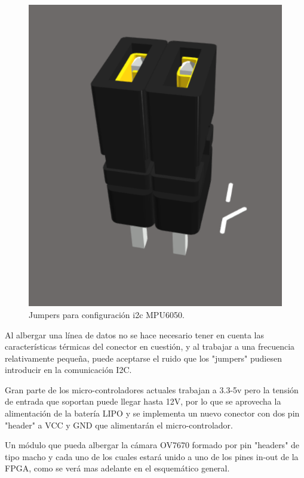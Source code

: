 \begin{itemize}
{		\begin{figure}[H]
			\center
			\includegraphics[scale=0.5]{imagenes/Balancing_robot/jumpers.PNG}
			\caption{Jumpers para configuración i2c MPU6050.}
			\label{fig:jumpers}
		\end{figure}
		
		
		Al albergar una línea de datos no se hace necesario tener en cuenta las características térmicas del conector en cuestión, y al trabajar a una frecuencia relativamente pequeña, puede aceptarse el ruido que los "jumpers" pudiesen introducir en la comunicación I2C.
		
		\item Gran parte de los micro-controladores actuales trabajan a 3.3-5v pero la tensión de entrada que soportan puede llegar hasta 12V, por lo que se aprovecha la alimentación de la batería LIPO y se implementa un nuevo conector con dos pin "header" a VCC y GND que alimentarán el micro-controlador.
		
		\item Un módulo que pueda albergar la cámara OV7670 formado por pin "headers" de tipo macho y cada uno de los cuales estará unido a uno de los pines in-out de la FPGA, como se verá mas adelante en el esquemático general. 
		
}
\end{itemize}
